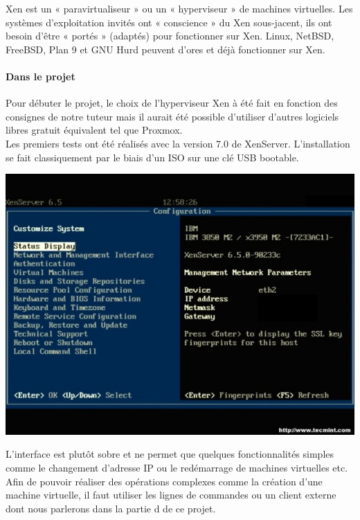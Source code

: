 \documentclass[a4paper,12pt]{extarticle}
\begin{document}
Xen est un « paravirtualiseur » ou un « hyperviseur » de machines virtuelles. Les systèmes d'exploitation invités ont « conscience » du Xen sous-jacent, ils ont besoin d'être « portés » (adaptés) pour fonctionner sur Xen. Linux, NetBSD, FreeBSD, Plan 9 et GNU Hurd peuvent d'ores et déjà fonctionner sur Xen.\\

\paragraph{Dans le projet\\}

Pour débuter le projet, le choix de l’hyperviseur Xen à été fait en fonction des consignes de notre tuteur mais il aurait été possible d’utiliser d’autres logiciels libres gratuit équivalent tel que Proxmox. \\
Les premiers tests ont été réalisés avec la version 7.0 de XenServer. L’installation se fait classiquement par le biais d’un ISO sur une clé USB bootable.

\begin{center}
\includegraphics[scale=0.60]{xenserver18}\\
\end{center}

L’interface est plutôt sobre et ne permet que quelques fonctionnalités simples comme le changement d’adresse IP ou le redémarrage de machines virtuelles etc. Afin de pouvoir réaliser des opérations complexes comme la création d’une machine virtuelle, il faut utiliser les lignes de commandes ou un client externe dont nous parlerons dans la partie d de ce projet.\\
\end{document}

